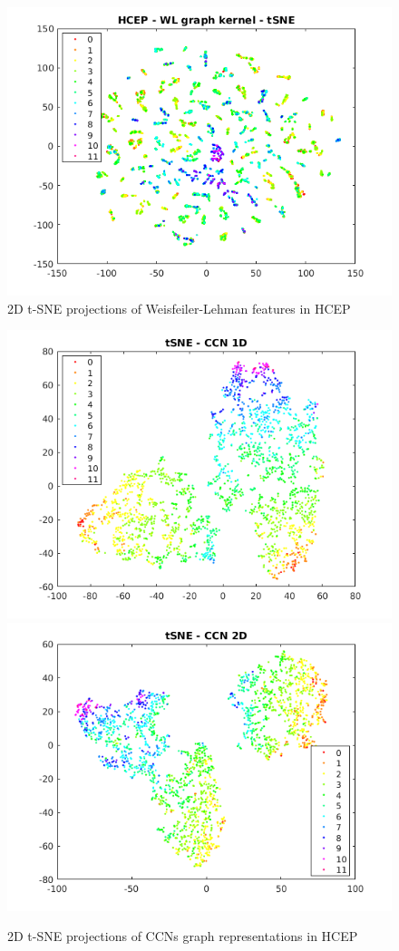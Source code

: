 \documentclass[sigchi]{acmart}
\theoremstyle{definition}
\theoremstyle{theorem}
\theoremstyle{corollary}
\theoremstyle{lemma}
\theoremstyle{remark}
\theoremstyle{prop}
\begin{document}
\begin{figure}
\caption{\label{fig:tSNE-WL} 2D t-SNE projections of Weisfeiler-Lehman features in HCEP}
\centering
\includegraphics[scale=0.5]{tSNE_WL}
\end{figure}
\begin{figure}
\caption{\label{fig:tSNE-CCN} 2D t-SNE projections of CCNs graph representations in HCEP}
\centering
\includegraphics[scale=0.5]{tSNE_CCN_1D}
\includegraphics[scale=0.5]{tSNE_CCN_2D}
\end{figure}
\end{document}
